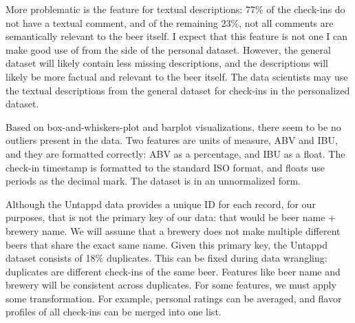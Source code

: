 \documentclass[sigconf]{acmart}
\begin{document}
More problematic is the feature for textual descriptions: 77\% of the check-ins do not have a textual comment, and of the remaining 23\%, not all comments are semantically relevant to the beer itself.
I expect that this feature is not one I can make good use of from the side of the personal dataset.
However, the general dataset will likely contain less missing descriptions, and the descriptions will likely be more factual and relevant to the beer itself.
The data scientists may use the textual descriptions from the general dataset for check-ins in the personalized dataset.

Based on box-and-whiskers-plot and barplot visualizations, there seem to be no outliers present in the data.
Two features are units of measure, ABV and IBU, and they are formatted correctly: ABV as a percentage, and IBU as a float.
The check-in timestamp is formatted to the standard ISO format, and floats use periods as the decimal mark.
The dataset is in an unnormalized form.

Although the Untappd data provides a unique ID for each record, for our purposes, that is not the primary key of our data: that would be beer name + brewery name.
We will assume that a brewery does not make multiple different beers that share the exact same name.
Given this primary key, the Untappd dataset consists of 18\% duplicates.
This can be fixed during data wrangling: duplicates are different check-ins of the same beer.
Features like beer name and brewery will be consistent across duplicates.
For some features, we must apply some transformation. 
For example, personal ratings can be averaged, and flavor profiles of all check-ins can be merged into one list.
\end{document}
